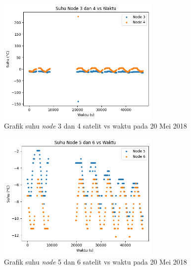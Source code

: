 \begin{figure}[H]
\setlength{}
\begin{center}
\includegraphics[width=0.7\textwidth]{fig/raw_node34_temp_2018-05-20.png}
	\caption{Grafik suhu \textit{node} 3 dan 4 satelit vs waktu pada 20 Mei 2018}
\label{fig:rawtemp3420}
\end{center}
\end{figure}

\begin{figure}[H]
\setlength{}
\begin{center}
\includegraphics[width=0.7\textwidth]{fig/raw_node56_temp_2018-05-20.png}
	\caption{Grafik suhu \textit{node} 5 dan 6 satelit vs waktu pada 20 Mei 2018}
\label{fig:rawtemp5620}
\end{center}
\end{figure}


